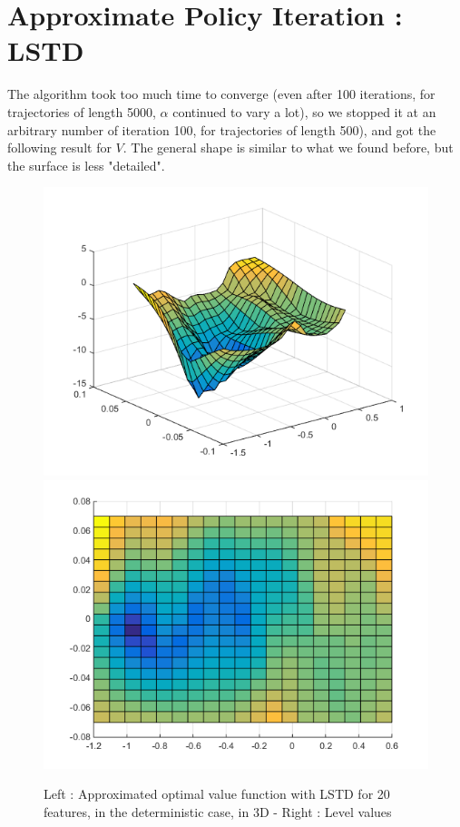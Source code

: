 \documentclass[a4paper, 12pt]{article}
\begin{document}
\section{Approximate Policy Iteration : LSTD}

The algorithm took too much time to converge (even after 100 iterations, for trajectories of length 5000, $\alpha$ continued to vary a lot), so we stopped it at an arbitrary number of iteration 100, for trajectories of length 500), and got the following result for $V$. The general shape is similar to what we found before, but the surface is less "detailed".
\begin{figure}[H]
	\centering
	\noindent\includegraphics[scale=0.3]{lstd-20feat-determ.png}
	\noindent\includegraphics[scale=0.3]{lstd-20feat-determ-flat.png}
	\caption{Left : Approximated optimal value function with LSTD for 20 features, in the deterministic case, in 3D - Right : Level values}
\end{figure}
\end{document}
